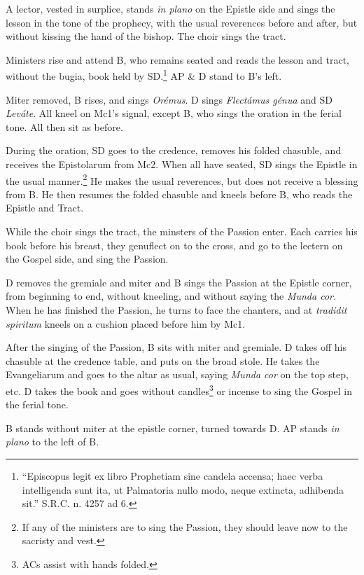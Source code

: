 {    \rubric A lector, vested in surplice, stands \textit{in plano} on the
    Epistle side and sings the lesson in the tone of the prophecy, with the
    usual reverences before and after, but without kissing the hand of the
    bishop. The choir sings the tract.

    \rubric Ministers rise and attend B, who remains seated and reads the
    lesson and tract, without the bugia, book held by SD.\footnote{``Episcopus
        legit ex libro Prophetiam sine candela accensa; haec verba intelligenda
        sunt ita, ut Palmatoria nullo modo, neque extincta, adhibenda sit.''
        S.R.C. n. 4257 ad 6.} AP \& D stand to B's left.

\rubric Miter removed, B rises, and sings \textit{Orémus}. D sings
\textit{Flectámus génua} and SD \textit{Leváte}. All kneel on Mc1's signal,
except B, who sings the oration in the ferial tone. All then sit as before.

\rubric During the oration, SD goes to the credence, removes his folded
chasuble, and receives the Epistolarum from Mc2. When all have seated, SD sings
the Epistle in the usual manner.\footnote{If any of the ministers are to sing
the Passion, they should leave now to the sacristy and vest.} He makes the
usual reverences, but does not receive a blessing from B. He then resumes
the folded chasuble and kneels before B, who reads the Epistle and Tract.

\rubric While the choir sings the tract, the minsters of the Passion enter.
Each carries his book before his breast, they genuflect on to the cross, and go
to the lectern on the Gospel side, and sing the Passion.

\rubric D removes the gremiale and miter and B sings the Passion at the Epistle
corner, from beginning to end, without kneeling, and without saying the
\textit{Munda cor.} When he has finished the Passion, he turns to face the
chanters, and at \textit{tradidit spiritum} kneels on a cushion placed before
him by Mc1.

\rubric After the singing of the Passion, B sits with miter and gremiale. D
takes off his chasuble at the credence table, and puts on the broad stole. He
takes the Evangeliarum and goes to the altar as usual, saying \textit{Munda
cor} on the top step, etc. D takes the book and goes without
candles\footnote{ACs assist with hands folded.} or incense to sing the Gospel
in the ferial tone.

\rubric B stands without miter at the epistle corner, turned towards D. AP
stands \textit{in plano} to the left of B.

}
